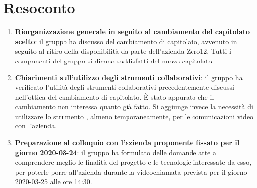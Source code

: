 \documentclass{article}
\begin{document}
\section{Resoconto}%
\label{resoconto}
\begin{enumerate}
  \item \textbf{Riorganizzazione generale in seguito al cambiamento del capitolato scelto}: il gruppo ha discusso del cambiamento di capitolato, avvenuto in seguito al ritiro della disponibilità
  da parte dell'azienda Zero12. Tutti i componenti del gruppo si dicono soddisfatti del nuovo capitolato.
  \item \textbf{Chiarimenti sull'utilizzo degli strumenti collaborativi}: il gruppo ha verificato l'utilità degli strumenti collaborativi precedentemente discussi nell'ottica del cambiamento di capitolato. È stato appurato
  che il cambiamento non interessa quanto già fatto. Si aggiunge invece la necessità di utilizzare lo strumento , almeno temporaneamente, per le comunicazioni video con l'azienda.
  \item \textbf{Preparazione al colloquio con l'azienda proponente fissato per il giorno 2020-03-24}: il gruppo ha formulato delle domande atte a comprendere meglio le finalità del progetto e le tecnologie
  interessate da esso, per poterle porre all'azienda durante la videochiamata prevista per il giorno 2020-03-25 alle ore 14:30.
\end{enumerate}
\end{document}

